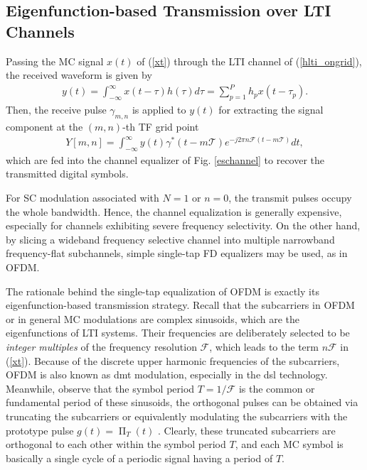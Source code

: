 \documentclass[journal]{IEEEtran}
\DeclareMathOperator{\rect}{\Pi}
\begin{document}
\vspace*{-4mm}
\subsection{Eigenfunction-based Transmission over LTI Channels}

Passing the MC signal $x(t)$ of (\ref{xt}) through the LTI channel of (\ref{hlti_ongrid}), the received waveform is given by
\begin{align}
  y(t)=\int_{-\infty}^{\infty}x(t-\tau)h(\tau) d\tau=\sum_{p=1}^P h_p x(t-\tau_p).
\end{align}
Then, the receive pulse $\gamma_{m,n}$ is applied to $y(t)$ for extracting the signal component at the $(m,n)$-th TF grid point
\begin{align}\label{rp}
  Y[m,n]=\int_{-\infty}^{\infty}y(t)\gamma^*(t-m\mathcal T)e^{-j2\pi n \mathcal F (t-m\mathcal T)} dt,
\end{align}
which are fed into the channel equalizer of Fig. \ref{eschannel} to recover the transmitted digital symbols. 

For SC modulation associated with $N=1$ or $n=0$, the transmit pulses occupy the whole bandwidth. Hence, the channel equalization is generally expensive, especially for channels exhibiting severe frequency selectivity.
On the other hand, by slicing a wideband frequency selective channel into multiple narrowband frequency-flat subchannels, simple single-tap FD equalizers may be used, as in OFDM\cite{ofdm}.

The rationale behind the single-tap equalization of OFDM is exactly its eigenfunction-based transmission strategy\cite{fwc}.
Recall that the subcarriers in OFDM or in general MC modulations are complex sinusoids, which are the eigenfunctions of LTI systems. Their frequencies are deliberately selected to be \emph{integer multiples} of the frequency resolution $\mathcal F$, which leads to the term $n\mathcal F$ in (\ref{xt}). {Because of the discrete upper harmonic frequencies of the subcarriers, OFDM is also known as \ac{dmt} modulation, especially in the \ac{dsl} technology\cite{adsl}.} Meanwhile, observe that the symbol period $T=1/\mathcal F$ is the common or fundamental period of these sinusoids,
the orthogonal pulses can be obtained via truncating the subcarriers or equivalently modulating the subcarriers with the prototype pulse $g(t)=\rect_T(t)$ \cite{toiotf_harmuth_60,ofdm_dft_weinstein_71,mc_commag_90}. Clearly, these truncated subcarriers are orthogonal to each other within the symbol period $T$, and each MC symbol is basically a single cycle of a periodic signal having a period of $T$.
\end{document}
